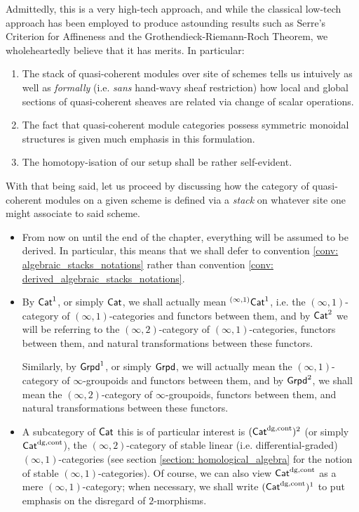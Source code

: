         Admittedly, this is a very high-tech approach, and while the classical low-tech approach has been employed to produce astounding results such as Serre's Criterion for Affineness and the Grothendieck-Riemann-Roch Theorem, we wholeheartedly believe that it has merits. In particular:
            \begin{enumerate}
                \item The stack of quasi-coherent modules over site of schemes tells us intuively as well as \textit{formally} (i.e. \textit{sans} hand-wavy sheaf restriction) how local and global sections of quasi-coherent sheaves are related via change of scalar operations. 
                \item The fact that quasi-coherent module categories possess symmetric monoidal structures is given much emphasis in this formulation.
                \item The homotopy-isation of our setup shall be rather self-evident.
            \end{enumerate}
        With that being said, let us proceed by discussing how the category of quasi-coherent modules on a given scheme is defined via a \textit{stack} on whatever site one might associate to said scheme.
    
        \begin{convention} \label{conv: schemes_2_everything_is_derived}
            \noindent
            \begin{itemize}
                \item From now on until the end of the chapter, everything will be assumed to be derived. In particular, this means that we shall defer to convention \ref{conv: algebraic_stacks_notations} rather than convention \ref{conv: derived_algebraic_stacks_notations}.
                \item By $\mathsf{Cat}^1$, or simply $\mathsf{Cat}$, we shall actually mean ${}^{(\infty, 1)}\mathsf{Cat}^1$, i.e. the $(\infty, 1)$-category of $(\infty, 1)$-categories and functors between them, and by $\mathsf{Cat}^2$ we will be referring to the $(\infty, 2)$-category of $(\infty, 1)$-categories, functors between them, and natural transformations between these functors. 
                
                Similarly, by $\mathsf{Grpd}^1$, or simply $\mathsf{Grpd}$, we will actually mean the $(\infty, 1)$-category of $\infty$-groupoids and functors between them, and by $\mathsf{Grpd}^2$, we shall mean the $(\infty, 2)$-category of $\infty$-groupoids, functors between them, and natural transformations between these functors.
                \item A subcategory of $\mathsf{Cat}$ this is of particular interest is $(\mathsf{Cat}^{\mathrm{dg}, \mathrm{cont}})^2$ (or simply $\mathsf{Cat}^{\mathrm{dg}, \mathrm{cont}}$), the $(\infty, 2)$-category of stable linear (i.e. differential-graded) $(\infty, 1)$-categories (see section \ref{section: homological_algebra} for the notion of stable $(\infty, 1)$-categories). Of course, we can also view $\mathsf{Cat}^{\mathrm{dg}, \mathrm{cont}}$ as a mere $(\infty, 1)$-category; when necessary, we shall write $(\mathsf{Cat}^{\mathrm{dg}, \mathrm{cont}})^1$ to put emphasis on the disregard of $2$-morphisms.
            \end{itemize} 
        \end{convention}
        
